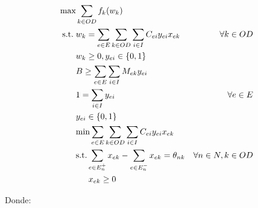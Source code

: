 \documentclass{article}
\newcommand{\modelspace}{\hspace{1.5em}}
\begin{document}
  \begin{align}
    \text{max}    & \sum_{k \in OD} f_k(w_k)                                                         & \label{eq:objective1lvl} \\
    \text{s.t.}\; & w_k = \sum_{e \in E} \sum_{k \in OD} \sum_{i \in I} C_{ei}y_{ei}x_{ek}           & \forall k \in OD \label{eq:shortestpath} \\
                  & w_k \geq 0, y_{ei} \in \left\{ 0, 1 \right\}                                     & \nonumber \\
                  & B \geq \sum_{e \in E} \sum_{i \in I} M_{ek}y_{ei}                                & \label{eq:respectbudget} \\
                  & 1 = \sum_{i \in I} y_{ei}                                                        & \forall e \in E \label{eq:alwaysoney} \\
                  & y_{ei} \in \left\{0, 1\right\}                                                   & \nonumber \\
                  & \text{min} \sum_{e \in E} \sum_{k \in OD} \sum_{i \in I} C_{ei}y_{ei}x_{ek}      & \label{eq:subproblem} \\
                  & \text{s.t.} \sum_{e \in E_n^+} x_{ek} - \sum_{e \in E_n^-} x_{ek} = \theta_{nk}  & \forall n \in N, k \in OD \label {eq:flowbalance} \\
                  & \modelspace x_{ek} \geq 0                                                        & \nonumber
  \end{align}

  Donde:
\end{document}
